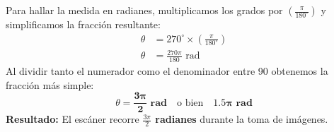 \documentclass[12pt]{article}
\begin{document}
\begin{tcolorbox}
    \vspace{0.4cm}
    \begin{tcolorbox}[colback=medteal!10, colframe=medteal, arc=2mm, boxrule=1.2pt, title=\textbf{Desarrollo Matemático y Solución}]
        Para hallar la medida en radianes, multiplicamos los grados por \textbf{$\left(\frac{\pi}{180^\circ}\right)$} y simplificamos la fracción resultante:
        \begin{align*}
            \theta &= 270^\circ \times \left( \frac{\pi}{180^\circ} \right) \\[1ex]
            \theta &= \frac{270\pi}{180} \text{ rad}
        \end{align*}
        Al dividir tanto el numerador como el denominador entre 90 obtenemos la fracción más simple:
        \[ \theta = \mathbf{\frac{3\pi}{2} \text{ rad}} \quad \text{o bien} \quad \mathbf{1.5\pi \text{ rad}} \]
        \textbf{Resultado:} El escáner recorre \textbf{$\frac{3\pi}{2}$ radianes} durante la toma de imágenes.
    \end{tcolorbox}
    
\end{tcolorbox}
\end{document}
